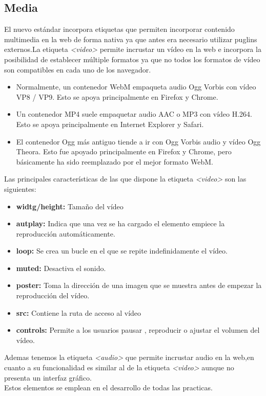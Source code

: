 \subsection{Media}
El nuevo estándar incorpora etiquetas que permiten incorporar contenido multimedia\cite{multimedia} en la web de forma nativa ya que antes era necesario utilizar puglins externos.La etiqueta \textit{<video>} permite incrustar un vídeo en la web e incorpora la posibilidad de establecer múltiple formatos ya que no todos los formatos de vídeo son compatibles en cada uno de los navegador.
\begin{itemize}
    \item Normalmente, un contenedor WebM empaqueta audio Ogg Vorbis con vídeo VP8 / VP9. Esto se apoya principalmente en Firefox y Chrome.
    \item Un contenedor MP4 suele empaquetar audio AAC o MP3 con vídeo H.264. Esto se apoya principalmente en Internet Explorer y Safari.
    \item El contenedor Ogg más antiguo tiende a ir con Ogg Vorbis audio y vídeo Ogg Theora. Esto fue apoyado principalmente en Firefox y Chrome, pero básicamente ha sido reemplazado por el mejor formato WebM. 
\end{itemize}
Las principales características de las que dispone la etiqueta \textit{<video>} son las siguientes:
\begin{itemize}
  \item\textbf{widtg/height:} Tamaño del vídeo
  \item \textbf{autplay:} Indica que una vez se ha cargado el elemento empiece la reproducción automáticamente.
  \item \textbf{loop:} Se crea un bucle en el que se repite indefinidamente el vídeo.
  \item \textbf{muted:} Desactiva el sonido.
  \item \textbf{poster:} Toma la dirección de una imagen que se muestra antes de empezar la reproducción del vídeo.
  \item \textbf{src:} Contiene la ruta de acceso al vídeo
  \item \textbf{controls:} Permite a los usuarios pausar , reproducir o ajustar el volumen del vídeo.
\end{itemize}
Ademas tenemos la etiqueta \textit{<audio>} que permite incrustar audio en la web,en cuanto a su funcionalidad es similar al de la etiqueta \textit{<video>} aunque no presenta un interfaz gráfico.
\\Estos elementos se emplean en el desarrollo de todas las practicas.
